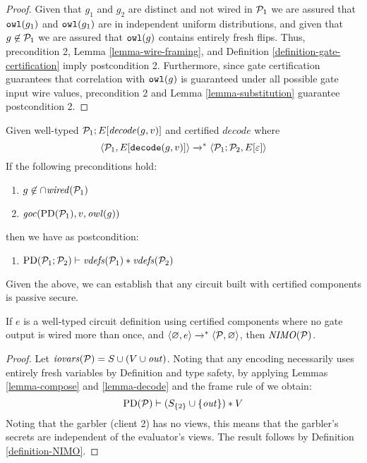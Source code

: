 \begin{proof}
  Given that $g_1$ and $g_2$ are distinct and not wired in $\mathcal{P}_1$
  we are assured that $\texttt{owl}(g_1)$ and $\texttt{owl}(g_1)$ are in
  independent uniform distributions, and given that $g \not\in
  \mathcal{P}_1$ we are assured that $\texttt{owl}(g)$ contains entirely fresh
  flips. Thus, precondition 2, Lemma \ref{lemma-wire-framing}, and
  Definition \ref{definition-gate-certification} imply postcondition
  2.  Furthermore, since gate certification guarantees that
  correlation with $\texttt{owl}(g)$ is guaranteed under all possible gate
  input wire values, precondition 2 and Lemma \ref{lemma-substitution}
  guarantee postcondition 2.
\end{proof}

\begin{lemma}
  \label{lemma-decode}
Given well-typed $\mathcal{P}_1;E[\mathit{decode}(g,v)]$ and certified $\mathit{decode}$ where 
$$
\langle \mathcal{P}_1,E[\texttt{decode}(g,v)] \rangle \xrightarrow{}^{*} \langle \mathcal{P}_1;\mathcal{P}_2,E[\varepsilon] \rangle
$$
If the following preconditions hold:
\begin{enumerate}
\item $g \not\in \cap \mathit{wired}(\mathcal{P}_1)$
\item $\mathit{goc}(\mathrm{PD}(\mathcal{P}_1),v,\mathit{owl}(g))$
\end{enumerate}
then we have as postcondition:
\begin{enumerate}
  \item $\mathrm{PD}(\mathcal{P}_1;\mathcal{P}_2) \vdash \mathit{vdefs}(\mathcal{P}_1) * \mathit{vdefs}(\mathcal{P}_2)$
\end{enumerate}
\end{lemma}
Given the above, we can establish that any circuit built with certified
components is passive secure. 
\begin{theorem}
  \label{theorem-ygc-NIMO}
  If $e$ is a well-typed circuit definition using certified components
  where no gate output is wired more than once, and $\langle \varnothing,e \rangle
  \xrightarrow{}^{*} \langle \mathcal{P},\varnothing \rangle$, then $\mathit{NIMO}(\mathcal{P})$. 
\end{theorem}

\begin{proof}
  Let $\mathit{iovars}(\mathcal{P}) = S \cup (V \cup \mathit{out})$. Noting that any
  encoding necessarily uses entirely fresh variables by Definition and
  type safety, by applying Lemmas \ref{lemma-compose} and
  \ref{lemma-decode} and the frame rule of
  \cite{barthe2019probabilistic} we obtain:
  $$
  \mathrm{PD}(\mathcal{P}) \vdash (S_{\{2\}}\cup\{\mathit{out}\}) * V
  $$
  Noting that the garbler (client 2) has no views, this means that
  the garbler's secrets are independent of the evaluator's views. The
  result follows by Definition \ref{definition-NIMO}.
\end{proof}


